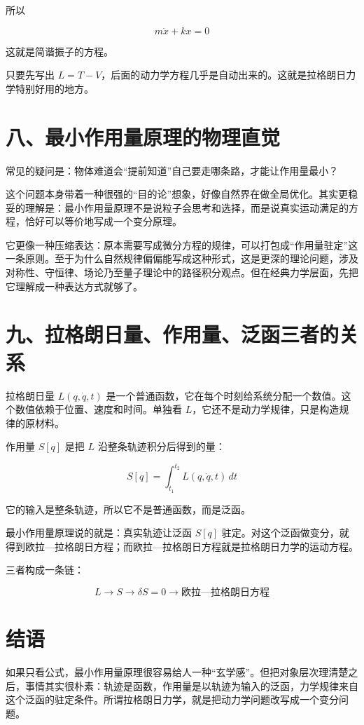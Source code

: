 所以

\[
m\ddot{x}+kx=0
\]

这就是简谐振子的方程。

只要先写出 \(L=T-V\)，后面的动力学方程几乎是自动出来的。这就是拉格朗日力学特别好用的地方。

\section{八、最小作用量原理的物理直觉}

常见的疑问是：物体难道会“提前知道”自己要走哪条路，才能让作用量最小？

这个问题本身带着一种很强的“目的论”想象，好像自然界在做全局优化。其实更稳妥的理解是：最小作用量原理不是说粒子会思考和选择，而是说真实运动满足的方程，恰好可以等价地写成一个变分原理。

它更像一种压缩表达：原本需要写成微分方程的规律，可以打包成“作用量驻定”这一条原则。至于为什么自然规律偏偏能写成这种形式，这是更深的理论问题，涉及对称性、守恒律、场论乃至量子理论中的路径积分观点。但在经典力学层面，先把它理解成一种表达方式就够了。

\section{九、拉格朗日量、作用量、泛函三者的关系}

拉格朗日量 \(L(q,\dot{q},t)\) 是一个普通函数，它在每个时刻给系统分配一个数值。这个数值依赖于位置、速度和时间。单独看 \(L\)，它还不是动力学规律，只是构造规律的原材料。

作用量 \(S[q]\) 是把 \(L\) 沿整条轨迹积分后得到的量：

\[
S[q]=\int_{t_1}^{t_2}L(q,\dot{q},t)\,dt
\]

它的输入是整条轨迹，所以它不是普通函数，而是泛函。

最小作用量原理说的就是：真实轨迹让泛函 \(S[q]\) 驻定。对这个泛函做变分，就得到欧拉—拉格朗日方程；而欧拉—拉格朗日方程就是拉格朗日力学的运动方程。

三者构成一条链：

\[
L \to S \to \delta S = 0 \to \text{欧拉—拉格朗日方程}
\]

\section{结语}

如果只看公式，最小作用量原理很容易给人一种“玄学感”。但把对象层次理清楚之后，事情其实很朴素：轨迹是函数，作用量是以轨迹为输入的泛函，力学规律来自这个泛函的驻定条件。所谓拉格朗日力学，就是把动力学问题改写成一个变分问题。
